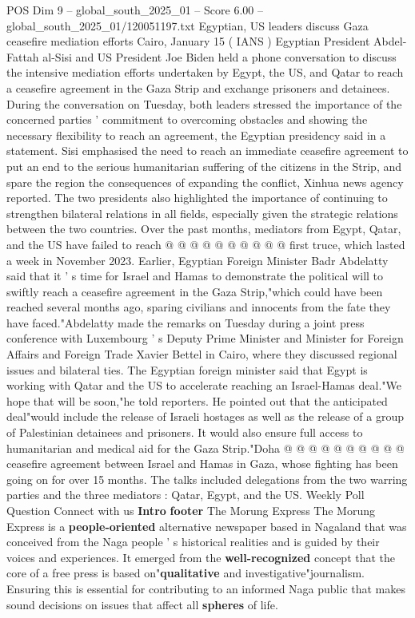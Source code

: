 \begin{textsample}{POS Dim 9 – global\_south\_2025\_01 – Score 6.00 – global\_south\_2025\_01/120051197.txt}  \label{ex:f9_pos_344}
Egyptian, US leaders discuss Gaza ceasefire mediation efforts Cairo, January 15 ( IANS ) Egyptian President Abdel-Fattah al-Sisi and US President Joe Biden held a phone conversation to discuss the intensive mediation efforts undertaken by Egypt, the US, and Qatar to reach a ceasefire agreement in the Gaza Strip and exchange prisoners and detainees.
During the conversation on Tuesday, both leaders stressed the importance of the concerned parties ' commitment to overcoming obstacles and showing the necessary flexibility to reach an agreement, the Egyptian presidency said in a statement.
Sisi emphasised the need to reach an immediate ceasefire agreement to put an end to the serious humanitarian suffering of the citizens in the Strip, and spare the region the consequences of expanding the conflict, Xinhua news agency reported.
The two presidents also highlighted the importance of continuing to strengthen bilateral relations in all fields, especially given the strategic relations between the two countries.
Over the past months, mediators from Egypt, Qatar, and the US have failed to reach @ @ @ @ @ @ @ @ @ @ first truce, which lasted a week in November 2023.
Earlier, Egyptian Foreign Minister Badr Abdelatty said that it ' s time for Israel and Hamas to demonstrate the political will to swiftly reach a ceasefire agreement in the Gaza Strip,"which could have been reached several months ago, sparing civilians and innocents from the fate they have faced."Abdelatty made the remarks on Tuesday during a joint press conference with Luxembourg ' s Deputy Prime Minister and Minister for Foreign Affairs and Foreign Trade Xavier Bettel in Cairo, where they discussed regional issues and bilateral ties.
The Egyptian foreign minister said that Egypt is working with Qatar and the US to accelerate reaching an Israel-Hamas deal."We hope that will be soon,"he told reporters.
He pointed out that the anticipated deal"would include the release of Israeli hostages as well as the release of a group of Palestinian detainees and prisoners.
It would also ensure full access to humanitarian and medical aid for the Gaza Strip."Doha @ @ @ @ @ @ @ @ @ @ ceasefire agreement between Israel and Hamas in Gaza, whose fighting has been going on for over 15 months.
The talks included delegations from the two warring parties and the three mediators : Qatar, Egypt, and the US.
Weekly Poll Question Connect with us \textbf{Intro} \textbf{footer} The Morung Express The Morung Express is a \textbf{people-oriented} alternative newspaper based in Nagaland that was conceived from the Naga people ' s historical realities and is guided by their voices and experiences.
It emerged from the \textbf{well-recognized} concept that the core of a free press is based on"\textbf{qualitative} and investigative"journalism.
Ensuring this is essential for contributing to an informed Naga public that makes sound decisions on issues that affect all \textbf{spheres} of life.

\end{textsample}
